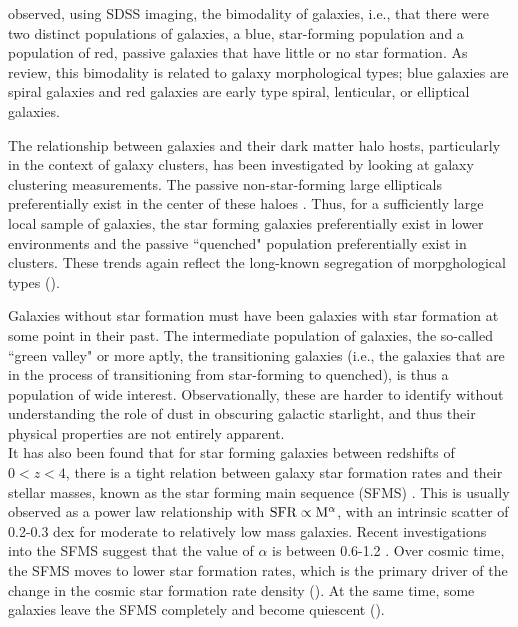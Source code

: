 \citet{2001AJ....122.1861S} observed, using SDSS imaging, the
bimodality of galaxies, i.e., that there were two distinct populations
of galaxies, a blue, star-forming population and a population of red,
passive galaxies that have little or no star formation. As
\citet{blanton_physical_2009-1} review, this bimodality is related to
galaxy morphological types; blue galaxies are spiral galaxies and red
galaxies are early type spiral, lenticular, or elliptical galaxies.

The relationship between galaxies and their dark matter halo hosts,
particularly in the context of galaxy clusters, has been investigated
by looking at galaxy clustering measurements.  The passive
non-star-forming large ellipticals preferentially exist in the center
of these haloes \citep{2005ApJ...633..791Z}. Thus, for a sufficiently
large local sample of galaxies, the star forming galaxies
preferentially exist in lower environments and the passive ``quenched"
population preferentially exist in clusters. These trends again
reflect the long-known segregation of morpghological types
(\citealt{dressler_galaxy_1980}).

Galaxies without star formation must have been galaxies with star
formation at some point in their past. The intermediate population of
galaxies, the so-called ``green valley" \citep{2007ApJS..173..293W} or
more aptly, the transitioning galaxies (i.e., the galaxies that are
in the process of transitioning from star-forming to quenched), is thus
a population of wide interest. Observationally, these are harder to
identify without understanding the role of dust in obscuring galactic
starlight, and thus their physical properties are not entirely
apparent.\\

It has also been found that for star forming galaxies between
redshifts of $0 < z < 4$, there is a tight relation between galaxy
star formation rates and their stellar masses, known as the star
forming main sequence (SFMS) \citep{brinchmann_physical_2004,
  2007ApJ...660L..43N, 2015A&A...575A..74S}. This is usually observed
as a power law relationship with ${\rm SFR} \propto {\rm M}^{\mathrm \alpha}$,
with an intrinsic scatter of 0.2-0.3 dex for moderate to relatively
low mass galaxies. Recent investigations into the SFMS suggest that
the value of $\alpha$ is between 0.6-1.2
\citep{2014ApJS..214...15S}. Over cosmic time, the SFMS moves to lower
star formation rates, which is the primary driver of the change in the
cosmic star formation rate density (\citealt{madau_cosmic_2014}). At
the same time, some galaxies leave the SFMS completely and become
quiescent (\citealt{moustakas_primus:_2013, hahn_primus_2015}).

